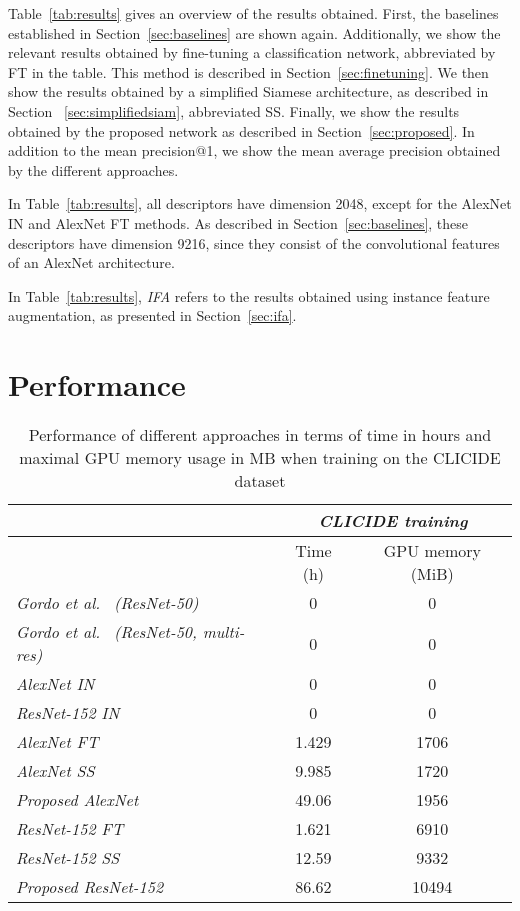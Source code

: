 Table~\ref{tab:results} gives an overview of the results obtained. First,
the baselines established in Section~\ref{sec:baselines} are shown
again. Additionally, we show the relevant results obtained by fine-tuning
a classification network, abbreviated by FT in the table. This method
is described in Section~\ref{sec:finetuning}. We then show the results
obtained by a simplified Siamese architecture, as described in Section
~\ref{sec:simplifiedsiam}, abbreviated SS. Finally, we show the results
obtained by the proposed network as described in Section~\ref{sec:proposed}.
In addition to the mean precision@1, we show the mean average
precision obtained by the different approaches.

In Table~\ref{tab:results}, all descriptors have dimension 2048, except
for the AlexNet IN and AlexNet FT methods. As described in
Section~\ref{sec:baselines}, these descriptors have dimension 9216,
since they consist of the convolutional features of an
AlexNet architecture.

In Table~\ref{tab:results}, \emph{IFA} refers to the results obtained
using instance feature augmentation, as presented in Section~\ref{sec:ifa}.

\section{Performance}\label{sec:perfresults}

\begin{table}
\centering
\begin{tabular}{|l|c|c|}
\hline & \multicolumn{2}{c|}{\emph{CLICIDE training}}\\
\hline & Time (h) & GPU memory (MiB)\\
\hline \emph{Gordo et al.~\cite{gordo_deep_2016} (ResNet-50)} & 0 & 0\\
\hline \emph{Gordo et al.~\cite{gordo_deep_2016} (ResNet-50, multi-res)}
& 0 & 0\\
\hline \emph{AlexNet IN} & 0 & 0\\
\hline \emph{ResNet-152 IN} & 0 & 0\\
\hline
\hline \emph{AlexNet FT} & 1.429 & 1706\\
\hline \emph{AlexNet SS} & 9.985 & 1720\\
\hline \emph{Proposed AlexNet} & 49.06 & 1956\\
\hline \emph{ResNet-152 FT} & 1.621 & 6910\\
\hline \emph{ResNet-152 SS} & 12.59 & 9332\\
\hline \emph{Proposed ResNet-152} & 86.62 & 10494\\
\hline
\end{tabular}
\caption{Performance of different approaches in terms of time in hours and
maximal GPU memory usage in MB when training on the CLICIDE dataset
\label{tab:perftrain}}
\end{table}

